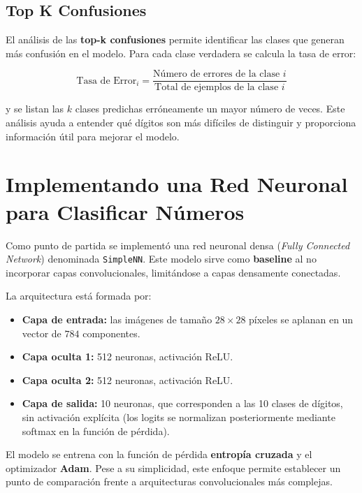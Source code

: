 \subsection*{Top K Confusiones}

El análisis de las \textbf{top-k confusiones} permite identificar las clases que generan más confusión en el modelo.
Para cada clase verdadera se calcula la tasa de error:

\begin{equation}
	\text{Tasa de Error}_i = \frac{\text{Número de errores de la clase } i}{\text{Total de ejemplos de la clase } i}
	\label{eq:topk}
\end{equation}

y se listan las $k$ clases predichas erróneamente un mayor número de veces.
Este análisis ayuda a entender qué dígitos son más difíciles de distinguir y proporciona información útil para mejorar el modelo.


\section{Implementando una Red Neuronal para Clasificar Números}

Como punto de partida se implementó una red neuronal densa (\textit{Fully Connected Network}) denominada \texttt{SimpleNN}.
Este modelo sirve como \textbf{baseline} al no incorporar capas convolucionales, limitándose a capas densamente conectadas.

La arquitectura está formada por:

\begin{itemize}
	\item \textbf{Capa de entrada:} las imágenes de tamaño $28 \times 28$ píxeles se aplanan en un vector de $784$ componentes.
	\item \textbf{Capa oculta 1:} 512 neuronas, activación ReLU.
	\item \textbf{Capa oculta 2:} 512 neuronas, activación ReLU.
	\item \textbf{Capa de salida:} 10 neuronas, que corresponden a las 10 clases de dígitos, sin activación explícita (los logits se normalizan posteriormente mediante softmax en la función de pérdida).
\end{itemize}

El modelo se entrena con la función de pérdida \textbf{entropía cruzada} y el optimizador \textbf{Adam}.
Pese a su simplicidad, este enfoque permite establecer un punto de comparación frente a arquitecturas convolucionales más complejas.


